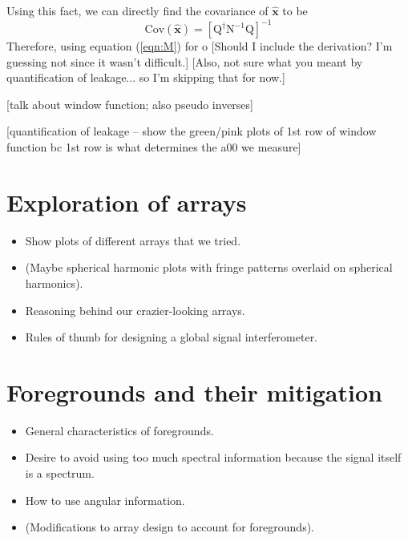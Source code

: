 \documentclass[twolcolumn,apj]{emulateapj}
\begin{document}
Using this fact, we can directly find the covariance of $\mathbf{\hat x}$ to be 
\begin{equation}
\textrm{Cov}(\mathbf{\hat x}) = [\textrm{Q}^\dagger \textrm{N}^{-1} \textrm{Q}]^{-1}
\end{equation}
Therefore, using equation (\ref{eqn:M}) for o
[Should I include the derivation? I'm guessing not since it wasn't difficult.] [Also, not sure what you meant by quantification of leakage... so I'm skipping that for now.]

[talk about window function; also pseudo inverses]

[quantification of leakage -- show the green/pink plots of 1st row of window function bc 1st row is what determines the a00 we measure]


\section{Exploration of arrays}
\begin{itemize}
\item Show plots of different arrays that we tried.
\item (Maybe spherical harmonic plots with fringe patterns overlaid on spherical harmonics).
\item Reasoning behind our crazier-looking arrays.
\item Rules of thumb for designing a global signal interferometer.
\end{itemize}

\section{Foregrounds and their mitigation}
\begin{itemize}
\item General characteristics of foregrounds.
\item Desire to avoid using too much spectral information because the signal itself is a spectrum.
\item How to use angular information.
\item (Modifications to array design to account for foregrounds).
\end{itemize}
\end{document}
